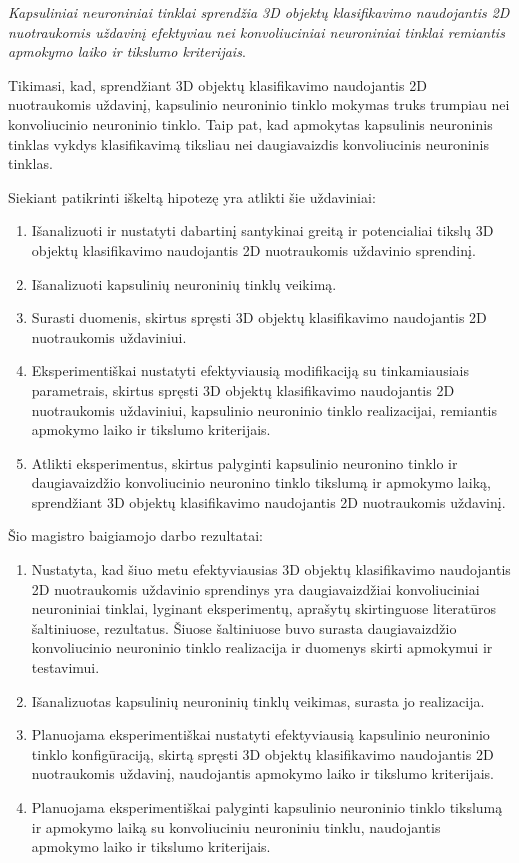 \textit{Kapsuliniai neuroniniai tinklai sprendžia 3D objektų klasifikavimo naudojantis 2D nuotraukomis uždavinį efektyviau nei konvoliuciniai neuroniniai tinklai remiantis apmokymo laiko ir tikslumo kriterijais}.

Tikimasi, kad, sprendžiant 3D objektų klasifikavimo naudojantis 2D nuotraukomis uždavinį, kapsulinio neuroninio tinklo mokymas truks trumpiau nei konvoliucinio neuroninio tinklo. Taip pat, kad apmokytas kapsulinis neuroninis tinklas vykdys klasifikavimą tiksliau nei daugiavaizdis konvoliucinis neuroninis tinklas.

Siekiant patikrinti iškeltą hipotezę yra atlikti šie uždaviniai:

\begin{enumerate}
	\item Išanalizuoti ir nustatyti dabartinį santykinai greitą ir potencialiai tikslų 3D objektų klasifikavimo naudojantis 2D nuotraukomis uždavinio sprendinį.
	\item Išanalizuoti kapsulinių neuroninių tinklų veikimą.
	\item Surasti duomenis, skirtus spręsti 3D objektų klasifikavimo naudojantis 2D nuotraukomis uždaviniui.
	\item Eksperimentiškai nustatyti efektyviausią modifikaciją su tinkamiausiais parametrais, skirtus spręsti 3D objektų klasifikavimo naudojantis 2D nuotraukomis uždaviniui, kapsulinio neuroninio tinklo realizacijai, remiantis apmokymo laiko ir tikslumo kriterijais.
	\item Atlikti eksperimentus, skirtus palyginti kapsulinio neuronino tinklo ir daugiavaizdžio konvoliucinio neuronino tinklo tikslumą ir apmokymo laiką, sprendžiant 3D objektų klasifikavimo naudojantis 2D nuotraukomis uždavinį.
\end{enumerate}

Šio magistro baigiamojo darbo rezultatai:

\begin{enumerate}
	\item Nustatyta, kad šiuo metu efektyviausias 3D objektų klasifikavimo naudojantis 2D nuotraukomis uždavinio sprendinys yra daugiavaizdžiai konvoliuciniai neuroniniai tinklai, lyginant eksperimentų, aprašytų skirtinguose literatūros šaltiniuose, rezultatus. Šiuose šaltiniuose buvo surasta daugiavaizdžio konvoliucinio neuroninio tinklo realizacija ir duomenys skirti apmokymui ir testavimui.
	\item Išanalizuotas kapsulinių neuroninių tinklų veikimas, surasta jo realizacija.
	\item Planuojama eksperimentiškai nustatyti efektyviausią kapsulinio neuroninio tinklo konfigūraciją, skirtą spręsti 3D objektų klasifikavimo naudojantis 2D nuotraukomis uždavinį, naudojantis apmokymo laiko ir tikslumo kriterijais.
	\item Planuojama eksperimentiškai palyginti kapsulinio neuroninio tinklo tikslumą ir apmokymo laiką su konvoliuciniu neuroniniu tinklu, naudojantis apmokymo laiko ir tikslumo kriterijais.
\end{enumerate}

